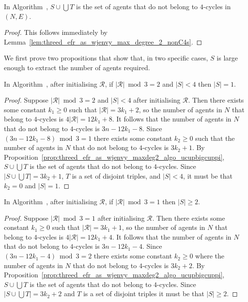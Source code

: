 

\begin{prop}
\label{prop:threed_efr_as_wjenvy_maxdeg2_algo_ucupbigcuppi}
In Algorithm~, $S \cup \bigcup T$ is the set of agents that do not belong to $4$-cycles in $(N, E)$.
\end{prop}
\begin{proof}
This follows immediately by Lemma~\ref{lem:threed_efr_as_wjenvy_max_degree_2_nonC4s}.
\end{proof}

We first prove two propositions that show that, in two specific cases, $S$ is large enough to extract the number of agents required.

\begin{prop}
\label{prop:threed_efr_as_wjenvy_maxdeg2_algo_rmod3is2_specialcase}
In Algorithm~, after initialising $\mathcal{R}$, if $|\mathcal{R}| \bmod 3 = 2$ and $|S| < 4$ then $|S| = 1$.
\end{prop}
\begin{proof}
Suppose $|\mathcal{R}| \bmod 3 = 2$ and $|S| < 4$ after initialising $\mathcal{R}$. Then there exists some constant $k_1 \geq 0$ such that $|\mathcal{R}| = 3{k_1} + 2$, so the number of agents in $N$ that belong to $4$-cycles is $4|\mathcal{R}| = 12{k_1} + 8$. It follows that the number of agents in $N$ that do not belong to $4$-cycles is $3n - 12{k_1} - 8$. Since $(3n - 12{k_1} - 8) \bmod 3 = 1$ there exists some constant $k_2 \geq 0$ such that the number of agents in $N$ that do not belong to $4$-cycles is $3{k_2} + 1$. By Proposition~\ref{prop:threed_efr_as_wjenvy_maxdeg2_algo_ucupbigcuppi}, $S \cup \bigcup T$ is the set of agents that do not belong to $4$-cycles. Since $|S \cup \bigcup T| = 3{k_2} + 1$, $T$ is a set of disjoint triples, and $|S| < 4$, it must be that ${k_2}=0$ and $|S|=1$.
\end{proof}

\begin{prop}
\label{prop:threed_efr_as_wjenvy_maxdeg2_algo_mod3is1}
In Algorithm~, after initialising $\mathcal{R}$, if $|\mathcal{R}| \bmod 3 = 1$ then $|S| \geq 2$.
\end{prop}
\begin{proof}
Suppose $|\mathcal{R}| \bmod 3 = 1$ after initialising $\mathcal{R}$. Then there exists some constant ${k_1} \geq 0$ such that $|\mathcal{R}| = 3{k_1} + 1$, so the number of agents in $N$ that belong to $4$-cycles is $4|\mathcal{R}| = 12{k_1} + 4$. It follows that the number of agents in $N$ that do not belong to $4$-cycles is $3n - 12{k_1} - 4$. Since $(3n - 12{k_1} - 4) \bmod 3 = 2$ there exists some constant ${k_2} \geq 0$ where the number of agents in $N$ that do not belong to $4$-cycles is $3{k_2} + 2$. By Proposition~\ref{prop:threed_efr_as_wjenvy_maxdeg2_algo_ucupbigcuppi}, $S \cup \bigcup T$ is the set of agents that do not belong to $4$-cycles. Since $|S \cup \bigcup T| = 3{k_2} + 2$ and $T$ is a set of disjoint triples it must be that $|S| \geq 2$.
\end{proof}

